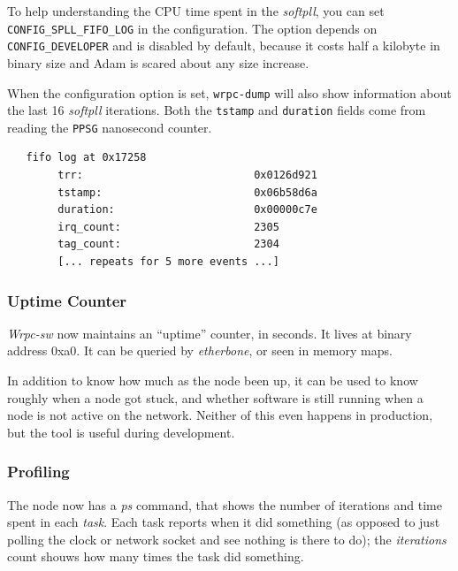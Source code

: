 \documentclass[a4paper, 12pt]{article}
\begin{document}
To help understanding the CPU time spent in the \textit{softpll}, you can
set \texttt{CONFIG\_SPLL\_FIFO\_LOG} in the configuration. The option
depends on \texttt{CONFIG\_DEVELOPER} and is disabled by default, because
it costs half a kilobyte in binary size and Adam is scared about any size
increase.

When the configuration option is set, \texttt{wrpc-dump} will also show
information about the last 16 \textit{softpll} iterations. Both the \texttt{tstamp}
and \texttt{duration} fields come from reading the \texttt{PPSG} nanosecond counter.

\begin{lstlisting}
   fifo log at 0x17258
        trr:                           0x0126d921
        tstamp:                        0x06b58d6a
        duration:                      0x00000c7e
        irq_count:                     2305
        tag_count:                     2304
        [... repeats for 5 more events ...]
\end{lstlisting}

\subsubsection{Uptime Counter}
\label{Uptime Counter}

\textit{Wrpc-sw} now maintains an ``uptime'' counter, in seconds. It lives
at binary address 0xa0. It can be queried by \textit{etherbone}, or
seen in memory maps.

In addition to know how much as the node been up, it can be used to
know roughly when a node got stuck, and whether software is still
running when a node is not active on the network. Neither of this even
happens in production, but the tool is useful during development.

\subsubsection{Profiling}
\label{Profiling}

The node now has a \textit{ps} command, that shows the number of iterations
and time spent in each \textit{task}. Each task reports when it did
something (as opposed to just polling the clock or network socket and
see nothing is there to do); the \textit{iterations} count shouws how many
times the task did something.
\end{document}
